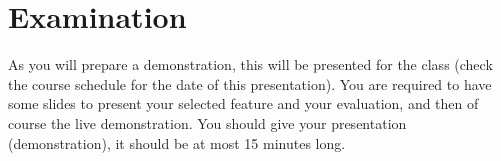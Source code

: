 \documentclass[a4paper,nocourse]{miunasgn}
\begin{document}
\section{Examination}
\label{sec:examination}
As you will prepare a demonstration, this will be presented for the class 
(check the course schedule for the date of this presentation).
You are required to have some slides to present your selected feature and your 
evaluation, and then of course the live demonstration.
You should give your presentation (demonstration), it should be at most 15 
minutes long.


\printbibliography
\end{document}
